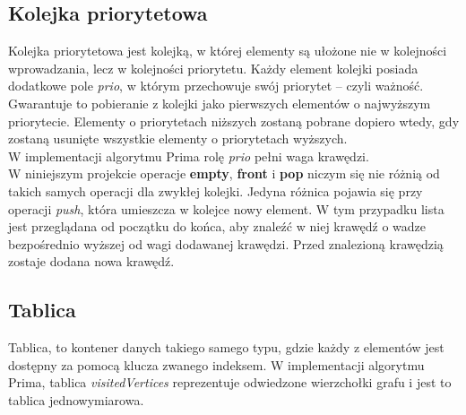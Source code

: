 \subsection{Kolejka priorytetowa}
Kolejka priorytetowa jest kolejką, w której elementy są ułożone nie w kolejności wprowadzania, lecz w kolejności priorytetu. Każdy element kolejki posiada dodatkowe pole \emph{prio}, w którym przechowuje swój priorytet – czyli ważność. Gwarantuje to pobieranie z kolejki jako pierwszych elementów o najwyższym priorytecie. Elementy o priorytetach niższych zostaną pobrane dopiero wtedy, gdy zostaną usunięte wszystkie elementy o priorytetach wyższych.\\
W implementacji algorytmu Prima rolę \emph{prio} pełni waga krawędzi.\\
W niniejszym projekcie operacje \textbf{empty}, \textbf{front} i \textbf{pop} niczym się nie różnią od takich samych operacji dla zwykłej kolejki. Jedyna różnica pojawia się przy operacji \emph{push}, która umieszcza w kolejce nowy element. W tym przypadku lista jest przeglądana od początku do końca, aby znaleźć w niej krawędź o wadze bezpośrednio wyższej od wagi dodawanej krawędzi. Przed znalezioną krawędzią zostaje dodana nowa krawędź.\\

\subsection{Tablica}
Tablica, to kontener danych takiego samego typu, gdzie każdy z elementów jest dostępny za pomocą klucza zwanego indeksem. W implementacji algorytmu Prima, tablica \emph{visitedVertices} reprezentuje odwiedzone wierzchołki grafu i jest to tablica jednowymiarowa.\\

\newpage
